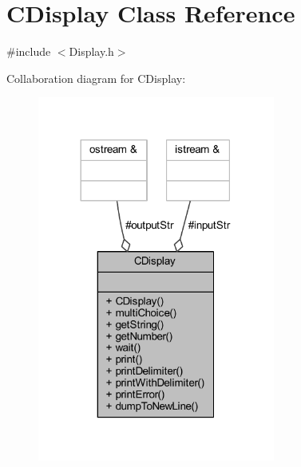 \hypertarget{class_c_display}{}\section{C\+Display Class Reference}
\label{class_c_display}


{\ttfamily \#include $<$Display.\+h$>$}



Collaboration diagram for C\+Display\+:\nopagebreak
\begin{figure}[H]
\begin{center}
\leavevmode
\includegraphics[width=221pt]{class_c_display__coll__graph}
\end{center}
\end{figure}
